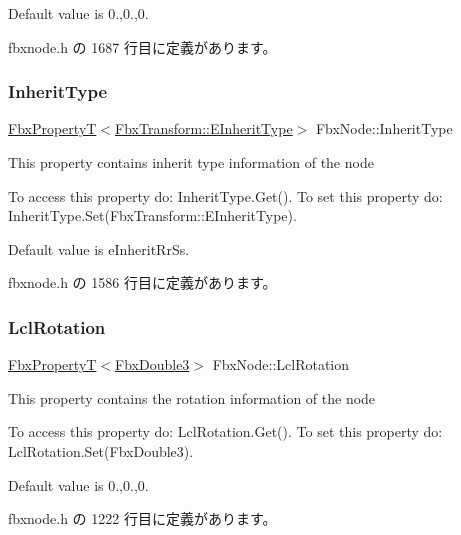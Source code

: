 Default value is 0.,0.,0. 

 fbxnode.\+h の 1687 行目に定義があります。

\mbox{\label{class_fbx_node_a649fc6e97217d0105e65b712d2b0053f}} 
\subsubsection{\texorpdfstring{Inherit\+Type}{InheritType}}
{\footnotesize\ttfamily \hyperlink{class_fbx_property_t}{Fbx\+PropertyT}$<$\hyperlink{class_fbx_transform_ac1ab8f75b4873723daa68c57f999b10f}{Fbx\+Transform\+::\+E\+Inherit\+Type}$>$ Fbx\+Node\+::\+Inherit\+Type}

This property contains inherit type information of the node

To access this property do\+: Inherit\+Type.\+Get(). To set this property do\+: Inherit\+Type.\+Set(\+Fbx\+Transform\+::\+E\+Inherit\+Type).

Default value is e\+Inherit\+Rr\+Ss. 

 fbxnode.\+h の 1586 行目に定義があります。

\mbox{\label{class_fbx_node_a011d40e1a84b3d64522a8ec3f20062a6}} 
\subsubsection{\texorpdfstring{Lcl\+Rotation}{LclRotation}}
{\footnotesize\ttfamily \hyperlink{class_fbx_property_t}{Fbx\+PropertyT}$<$\hyperlink{fbxtypes_8h_ae0a96f14cde566774c7553aa7523b7a7}{Fbx\+Double3}$>$ Fbx\+Node\+::\+Lcl\+Rotation}

This property contains the rotation information of the node

To access this property do\+: Lcl\+Rotation.\+Get(). To set this property do\+: Lcl\+Rotation.\+Set(\+Fbx\+Double3).

Default value is 0.,0.,0. 

 fbxnode.\+h の 1222 行目に定義があります。

\mbox{\label{class_fbx_node_a0a4eedf3bcdb17a7ceb8e60731f4614c}} 
